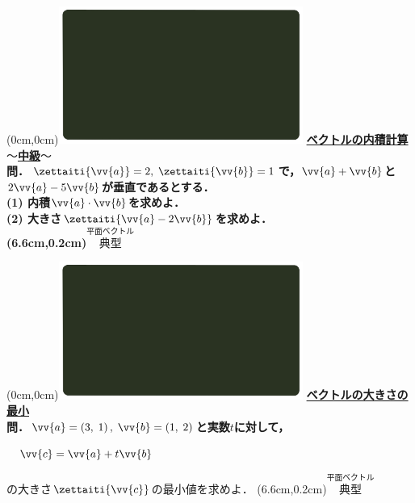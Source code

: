 \documentclass[10pt,
fleqn,
dvipdfmx,
uplatex
]{jsarticle}
\begin{document}
\at(0cm,0cm){\includegraphics[width=8cm,bb=0 0 1920 1080]{./media_local/smart_background/平面ベクトル.jpeg}}
{\color{orange}\bf\boldmath\Large\underline{ベクトルの内積計算$〜$中級$〜$}}\vspace{0.3zw}\\
\Large 
\bf\boldmath 問．$\zettaiti{\vv {a}}=2,\;\zettaiti{\vv {b}}=1$で，$\vv {a}+\vv {b}$と$2\vv {a}-5\vv {b}$が垂直であるとする．\\
(1)  内積$\vv {a}\cdot \vv {b}$を求めよ．\\
(2)  大きさ$\zettaiti{\vv {a}-2\vv {b}}$を求めよ．\\

\at(6.6cm,0.2cm){\small\color{bradorange}$\overset{\text{平面ベクトル}}{\text{典型}}$}


\newpage



\at(0cm,0cm){\includegraphics[width=8cm,bb=0 0 1920 1080]{./media_local/smart_background/平面ベクトル.jpeg}}
{\color{orange}\bf\boldmath\Large\underline{ベクトルの大きさの最小}}\vspace{0.3zw}\\
\Large 
\bf\boldmath 問．$\vv {a}=\left(3,\;1\right),\;\vv {b}=\left(1,\;2\right)$と実数$t$に対して，
\vspace{0.3zw}

\LARGE\ \ $\vv {c}=\vv {a}+t\vv {b}$
\vspace{0.3zw}

\Large の大きさ$\zettaiti{\vv {c}}$の最小値を求めよ．
\at(6.6cm,0.2cm){\small\color{bradorange}$\overset{\text{平面ベクトル}}{\text{典型}}$}
\end{document}
